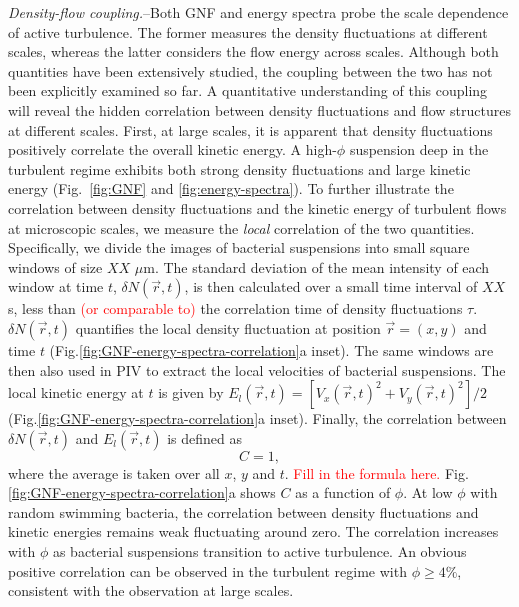 \documentclass[twocolumn,aps,prl,amsmath,amssymb,longbibliography]{revtex4-2}
\begin{document}
\textit{Density-flow coupling.}--Both GNF and energy spectra probe the scale dependence of active turbulence. The former measures the density fluctuations at different scales, whereas the latter considers the flow energy across scales. Although both quantities have been extensively studied, the coupling between the two has not been explicitly examined so far. A quantitative understanding of this coupling will reveal the hidden correlation between density fluctuations and flow structures at different scales. First, at large scales, it is apparent that density fluctuations positively correlate the overall kinetic energy. A high-$\phi$ suspension deep in the turbulent regime exhibits both strong density fluctuations and large kinetic energy (Fig.~\ref{fig:GNF} and \ref{fig:energy-spectra}). To further illustrate the correlation between density fluctuations and the kinetic energy of turbulent flows at microscopic scales, we measure the \emph{local} correlation of the two quantities. Specifically, we divide the images of bacterial suspensions into small square windows of size $XX$ $\mu$m. The standard deviation of the mean intensity of each window at time $t$, $\delta N(\vec{r},t)$, is then calculated over a small time interval of $XX$ s, less than \textcolor{red}{(or comparable to)} the correlation time of density fluctuations $\tau$.
$\delta N(\vec{r},t)$ quantifies the local density fluctuation at position $\vec{r} = (x,y)$ and time $t$ (Fig.\ref{fig:GNF-energy-spectra-correlation}a inset).
The same windows are then also used in PIV to extract the local velocities of bacterial suspensions. The local kinetic energy at $t$ is given by $E_l(\vec{r},t) = \left[ V_x(\vec{r},t)^2 + V_y(\vec{r},t)^2 \right]/2$ (Fig.\ref{fig:GNF-energy-spectra-correlation}a inset). Finally, the correlation between $\delta N(\vec{r},t)$ and $E_l(\vec{r},t)$ is defined as
\begin{equation}
C = 1,
\end{equation}
where the average is taken over all $x$, $y$ and $t$. \textcolor{red}{Fill in the formula here.} Fig.\ref{fig:GNF-energy-spectra-correlation}a shows $C$ as a function of $\phi$. At low $\phi$ with random swimming bacteria, the correlation between density fluctuations and kinetic energies remains weak fluctuating around zero. The correlation increases with $\phi$ as bacterial suspensions transition to active turbulence. An obvious positive correlation can be observed in the turbulent regime with $\phi \ge 4\%$, consistent with the observation at large scales.
\end{document}
